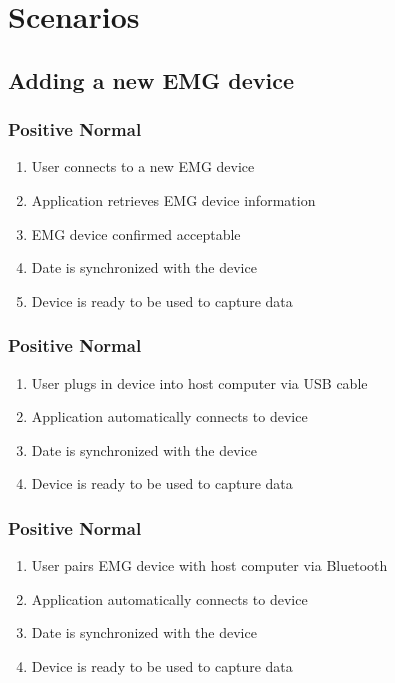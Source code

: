 \documentclass[12pt,a4paper]{article}
\begin{document}
\newpage

\section{Scenarios}

\subsection{Adding a new EMG device}

\subsubsection{Positive Normal}

\begin{enumerate}
	\item User connects to a new EMG device
	\item Application retrieves EMG device information
	\item EMG device confirmed acceptable
	\item Date is synchronized with the device
	\item Device is ready to be used to capture data
\end{enumerate}

\subsubsection{Positive Normal}

\begin{enumerate}
	\item User plugs in device into host computer via USB cable
	\item Application automatically connects to device
	\item Date is synchronized with the device
	\item Device is ready to be used to capture data
\end{enumerate}

\subsubsection{Positive Normal}

\begin{enumerate}
	\item User pairs EMG device with host computer via Bluetooth
	\item Application automatically connects to device
	\item Date is synchronized with the device
	\item Device is ready to be used to capture data
\end{enumerate}
\end{document}
